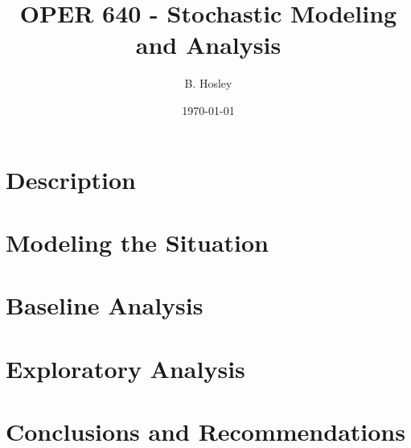 \documentclass[12pt]{amsart}
\title{OPER 640 - Stochastic Modeling and Analysis}
\author{B. Hosley}
\date{\today}
\begin{document}
	\maketitle
	\raggedbottom

\section{Description}


\section{Modeling the Situation}





\section{Baseline Analysis}


\section{Exploratory Analysis}


\section{Conclusions and Recommendations}

\end{document}
